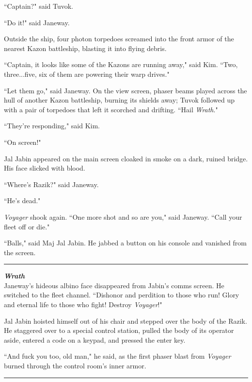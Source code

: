 \documentclass[twoside,letterpaper,12pt]{memoir}
\begin{document}
``Captain?" said Tuvok. 

``Do it!" said Janeway. 

Outside the ship, four photon torpedoes screamed into the front armor of the nearest Kazon battleship, blasting it into flying debris. 

``Captain, it looks like some of the Kazons are running away," said Kim. ``Two, three...five, six of them are powering their warp drives." 

``Let them go," said Janeway. On the view screen, phaser beams played across the hull of another Kazon battleship, burning its shields away; Tuvok followed up with a pair of torpedoes that left it scorched and drifting. ``Hail \textit{Wrath}." 

``They're responding," said Kim. 

``On screen!" 

Jal Jabin appeared on the main screen cloaked in smoke on a dark, ruined bridge. His face slicked with blood. 

``Where's Razik?" said Janeway. 

``He's dead." 

\textit{Voyager }shook again. ``One more shot and so are you," said Janeway. ``Call your fleet off or die." 

``Balls," said Maj Jal Jabin. He jabbed a button on his console and vanished from the screen. 

\begin{center}\rule{3cm}{0.4 pt}\end{center} 

\noindent\textit{\textbf{Wrath}}\\

Janeway's hideous albino face disappeared from Jabin's comms screen. He switched to the fleet channel. ``Dishonor and perdition to those who run! Glory and eternal life to those who fight! Destroy \textit{Voyager}!" 

Jal Jabin hoisted himself out of his chair and stepped over the body of the Razik. He staggered over to a special control station, pulled the body of its operator aside, entered a code on a keypad, and pressed the enter key. 

``And fuck you too, old man," he said, as the first phaser blast from \textit{Voyager} burned through the control room's inner armor. 

\begin{center}\rule{3cm}{0.4 pt}\end{center} 
\end{document}
